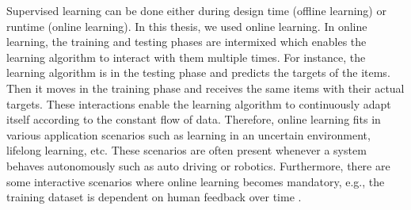\documentclass[a4paper,12pt]{article}
\begin{document}
Supervised learning can be done either during design time (offline learning) or runtime (online learning). In this thesis, we used online learning. In online learning, the training and testing phases are intermixed which enables the learning algorithm to interact with them multiple times. For instance, the learning algorithm is in the testing phase and predicts the targets of the items. Then it moves in the training phase and receives the same items with their actual targets. These interactions enable the learning algorithm to continuously adapt itself according to the constant flow of data. Therefore, online learning fits in various application scenarios such as learning in an uncertain environment, lifelong learning, etc. These scenarios are often present whenever a system behaves autonomously such as auto driving or robotics. Furthermore, there are some interactive scenarios where online learning becomes mandatory, e.g., the training dataset is dependent on human feedback over time \cite{ILAAA-2016}.
\end{document}
